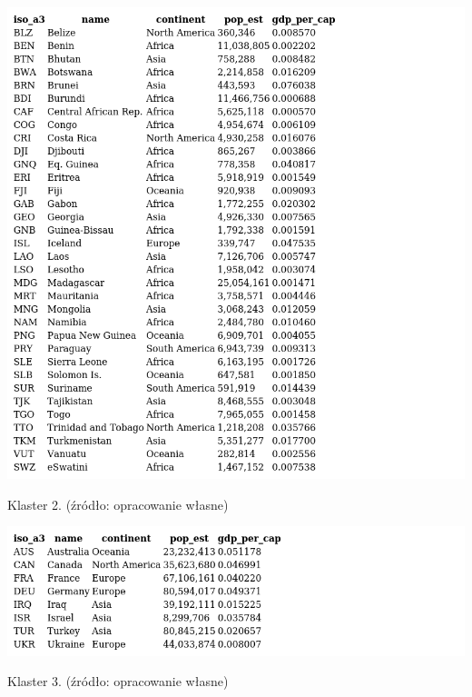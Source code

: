 \documentclass[11pt]{report}
\begin{document}
    \begin{table}[!htp]
        \centering
        \includegraphics[width=\linewidth]{tables/CLUST/clust2kmeans.png}
        \caption{Klaster 2. (źródło: opracowanie własne)}
        \label{tab:cl2}
    \end{table}

    \begin{table}[!htp]
        \centering
        \includegraphics[width=\linewidth]{tables/CLUST/clust3kmeans.png}
        \caption{Klaster 3. (źródło: opracowanie własne)}
        \label{tab:cl3}
    \end{table}
\end{document}

